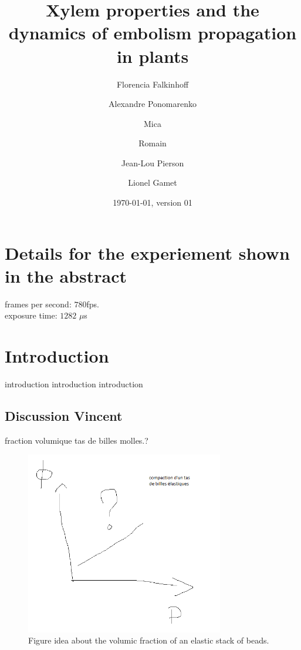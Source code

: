 \documentclass[twocolumn,amsmath,amssymb,floatfix]{revtex4}
\begin{document}
\title{Xylem properties and the dynamics of embolism propagation in plants}
\author{Florencia Falkinhoff}

\author{Alexandre Ponomarenko}
\author{Mica}
\author{Romain}

\author{Jean-Lou Pierson}
\author{Lionel Gamet}
\date{\today, version 01}
\begin{abstract}
\end{abstract}
\maketitle

\section{Details for the experiement shown in the abstract}

frames per second: $780$fps.\\
exposure time: $1282$  $\mu$s\\


\section{Introduction}
introduction introduction introduction

\subsection{Discussion Vincent}

fraction volumique tas de billes molles.?

\begin{figure}
\includegraphics[height=8cm]{figures/elasticBeadsStack_VolumicFraction.png}
\caption{Figure idea about the volumic fraction of an elastic stack of beads.}
\label{fig:volFrac_elasticStac}
\end{figure}
\end{document}
